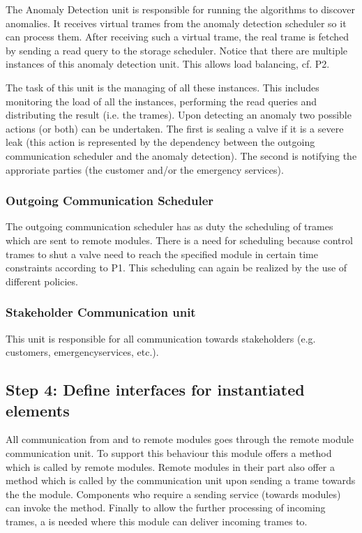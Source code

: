 \npar The Anomaly Detection unit is responsible for running the algorithms to
discover anomalies. It receives virtual trames from the anomaly detection
scheduler so it can process them. After receiving such a virtual trame, the
real trame is fetched by sending a read query to the storage scheduler. Notice
that there are multiple instances of this anomaly detection unit. This allows
load balancing, cf. P2. 

\npar The task of this unit is the managing of all these instances. This
includes monitoring the load of all the instances, performing the read queries
and distributing the result (i.e. the trames). Upon detecting an anomaly two
possible actions (or both) can be undertaken. The first is sealing a valve if
it is a severe leak (this action is represented by the dependency between the
outgoing communication scheduler and the anomaly detection). The second is
notifying the approriate parties (the customer and/or the emergency services).

\subsubsection{Outgoing Communication Scheduler}

\npar The outgoing communication scheduler has as duty the scheduling of
trames which are sent to remote modules. There is a need for scheduling because
control trames to shut a valve need to reach the specified module in certain
time constraints according to P1. This scheduling can again be realized by the
use of different policies.

\subsubsection{Stakeholder Communication unit}

\npar This unit is responsible for all communication towards stakeholders (e.g.
customers, emergencyservices, etc.). 

\subsection{Step 4: Define interfaces for instantiated elements}
\label{add:it1/interfaces}


\npar All communication from and to remote modules goes through the remote
module communication unit. To support this behaviour this module offers a
 method which is called by remote modules. Remote
modules in their part also offer a  method which is called
by the communication unit upon sending a trame towards the the module. Components
who require a sending service (towards modules) can invoke the
 method. Finally to allow the further processing of
incoming trames, a  is needed where this
module can deliver incoming trames to.


